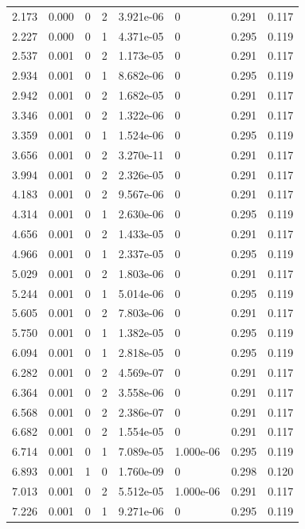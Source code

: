 \documentclass[preview]{standalone}
\begin{document}
{{\begin{tabular}{L{1.2cm}C{1.2cm} C{0.3cm}C{0.5cm} C{1.4cm}C{1.4cm} C{1.4cm}C{1.4cm}}
  2.173  &  0.000  & 0     &  2 &  3.921e-06  & 0  & 0.291 &  0.117   \\ 
  2.227  &  0.000  & 0     &  1 &  4.371e-05  & 0  & 0.295 &  0.119   \\ 
  2.537  &  0.001  & 0     &  2 &  1.173e-05  & 0  & 0.291 &  0.117   \\ 
  2.934  &  0.001  & 0     &  1 &  8.682e-06  & 0  & 0.295 &  0.119   \\ 
  2.942  &  0.001  & 0     &  2 &  1.682e-05  & 0  & 0.291 &  0.117   \\ 
  3.346  &  0.001  & 0     &  2 &  1.322e-06  & 0  & 0.291 &  0.117   \\ 
  3.359  &  0.001  & 0     &  1 &  1.524e-06  & 0  & 0.295 &  0.119   \\ 
  3.656  &  0.001  & 0     &  2 &  3.270e-11  & 0  & 0.291 &  0.117   \\ 
  3.994  &  0.001  & 0     &  2 &  2.326e-05  & 0  & 0.291 &  0.117   \\ 
  4.183  &  0.001  & 0     &  2 &  9.567e-06  & 0  & 0.291 &  0.117   \\ 
  4.314  &  0.001  & 0     &  1 &  2.630e-06  & 0  & 0.295 &  0.119   \\ 
  4.656  &  0.001  & 0     &  2 &  1.433e-05  & 0  & 0.291 &  0.117   \\ 
  4.966  &  0.001  & 0     &  1 &  2.337e-05  & 0  & 0.295 &  0.119   \\ 
  5.029  &  0.001  & 0     &  2 &  1.803e-06  & 0  & 0.291 &  0.117   \\ 
  5.244  &  0.001  & 0     &  1 &  5.014e-06  & 0  & 0.295 &  0.119   \\ 
  5.605  &  0.001  & 0     &  2 &  7.803e-06  & 0  & 0.291 &  0.117   \\ 
  5.750  &  0.001  & 0     &  1 &  1.382e-05  & 0  & 0.295 &  0.119   \\ 
  6.094  &  0.001  & 0     &  1 &  2.818e-05  & 0  & 0.295 &  0.119   \\ 
  6.282  &  0.001  & 0     &  2 &  4.569e-07  & 0  & 0.291 &  0.117   \\ 
  6.364  &  0.001  & 0     &  2 &  3.558e-06  & 0  & 0.291 &  0.117   \\ 
  6.568  &  0.001  & 0     &  2 &  2.386e-07  & 0  & 0.291 &  0.117   \\ 
  6.682  &  0.001  & 0     &  2 &  1.554e-05  & 0  & 0.291 &  0.117   \\ 
  6.714  &  0.001  & 0     &  1 &  7.089e-05  & 1.000e-06  & 0.295 &  0.119   \\ 
  6.893  &  0.001  & 1     &  0 &  1.760e-09  & 0  & 0.298 &  0.120   \\ 
  7.013  &  0.001  & 0     &  2 &  5.512e-05  & 1.000e-06  & 0.291 &  0.117   \\ 
  7.226  &  0.001  & 0     &  1 &  9.271e-06  & 0  & 0.295 &  0.119   \\ 
\hline 
\end{tabular} 

}}
\end{document}
